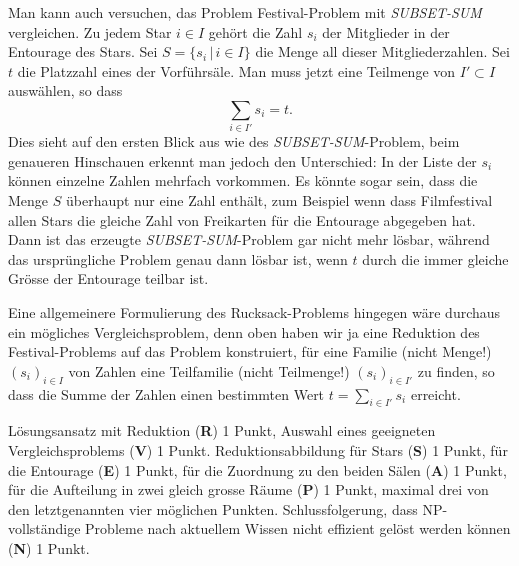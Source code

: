 \begin{diskussion}
Man kann auch versuchen, das Problem Festival-Problem mit
{\it SUBSET-SUM} vergleichen.
Zu jedem Star $i\in I$ gehört die Zahl $s_i$ der Mitglieder in der
Entourage des Stars. Sei $S=\{s_i\,|\,i\in I\}$ die Menge all dieser
Mitgliederzahlen. Sei $t$ die Platzzahl eines der Vorführsäle.
Man muss jetzt eine Teilmenge von $I'\subset I$ auswählen, so dass
\[
\sum_{i\in I'} s_i=t.
\]
Dies sieht auf den ersten Blick aus wie des {\it SUBSET-SUM}-Problem,
beim genaueren Hinschauen erkennt man jedoch den Unterschied: In der
Liste der $s_i$ können einzelne Zahlen mehrfach vorkommen. Es könnte
sogar sein, dass die Menge $S$ überhaupt nur eine Zahl enthält,
zum Beispiel wenn dass Filmfestival allen Stars die gleiche Zahl von
Freikarten für die Entourage abgegeben hat. Dann ist das erzeugte
{\it SUBSET-SUM}-Problem gar nicht mehr lösbar, während das ursprüngliche
Problem genau dann lösbar ist, wenn $t$ durch die immer gleiche Grösse
der Entourage teilbar ist. 

Eine allgemeinere Formulierung des Rucksack-Problems hingegen wäre
durchaus ein mögliches Vergleichsproblem, denn oben haben wir ja
eine Reduktion des Festival-Problems auf das Problem konstruiert,
für eine Familie (nicht Menge!) $(s_i)_{i\in I}$ von Zahlen eine
Teilfamilie (nicht Teilmenge!) $(s_i)_{i\in I'}$ zu finden, so dass
die Summe der Zahlen einen bestimmten Wert $t=\sum_{i\in I'}s_i$
erreicht.
\end{diskussion}

\begin{bewertung}
Lösungsansatz mit Reduktion ({\bf R}) 1 Punkt,
Auswahl eines geeigneten Vergleichsproblems ({\bf V}) 1 Punkt.
Reduktionsabbildung für Stars ({\bf S}) 1 Punkt,
für die Entourage ({\bf E}) 1 Punkt,
für die Zuordnung zu den beiden Sälen ({\bf A}) 1 Punkt,
für die Aufteilung in zwei gleich grosse Räume ({\bf P}) 1 Punkt,
maximal drei von den letztgenannten vier möglichen Punkten.
Schlussfolgerung, dass NP-vollständige Probleme nach aktuellem
Wissen nicht effizient gelöst werden können ({\bf N}) 1 Punkt.
\end{bewertung}
